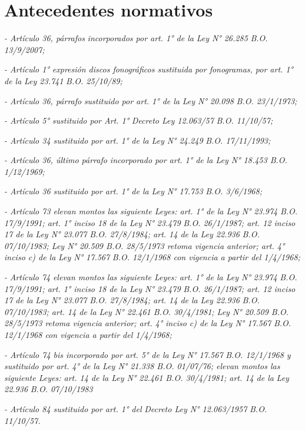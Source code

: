 \documentclass[10pt,a4paper]{article}
\newcommand{\nota}[1]{\par{\small\color{gris}#1\par}}
\begin{document}
\section{Antecedentes normativos}
\nota{\textit{- Artículo 36, párrafos }\textit{incorporados por art. 1° de la }\textit{Ley N° 26.285}\textit{ B.O. 13/9/2007;}}

\nota{\textit{- Artículo 1° expresión \textquotesingle{}discos fonográficos\textquotesingle{} sustituida por \textquotesingle{}fonogramas\textquotesingle{}, por art. 1° de la }\textit{Ley 23.741}\textit{ B.O. 25/10/89;}}

\nota{\textit{- Artículo 36, párrafo}\textit{ sustituido por art. 1° de la }\textit{Ley N° 20.098}\textit{ B.O. 23/1/1973;}}

\nota{\textit{- Artículo 5° sustituido por Art. 1° }\textit{Decreto Ley 12.063/57}\textit{ B.O. 11/10/57;}}

\nota{\textit{- Artículo 34 sustituido por art. 1° de la }\textit{Ley N° 24.249}\textit{ B.O. 17/11/1993;}}

\nota{\textit{- Artículo 36, último párrafo incorporado por art. 1° de la Ley N° 18.453 B.O. 1/12/1969;}}

\nota{\textit{- Artículo 36 sustituido por art. 1° de la }\textit{Ley N° 17.753}\textit{ B.O. 3/6/1968;}}

\nota{\textit{- Artículo 73 elevan montos las siguiente Leyes: art. 1° de la Ley N° }\textit{23.974}\textit{ B.O. 17/9/1991; art. 1° inciso 18 de la Ley N° }\textit{23.479}\textit{ B.O. 26/1/1987; art. 12 inciso 17 de la }\textit{Ley N° 23.077}\textit{ B.O. 27/8/1984; art. 14 de la }\textit{Ley 22.936}\textit{ B.O. 07/10/1983; Ley N° 20.509 B.O. 28/5/1973 retoma vigencia anterior; art. 4° inciso c) de la }\textit{Ley N° 17.567}\textit{ B.O. 12/1/1968 con vigencia a partir del 1/4/1968;}}

\nota{\textit{-} \textit{Artículo 74} \textit{elevan montos las siguiente Leyes: art. 1° de la Ley N° }\textit{23.974}\textit{ B.O. 17/9/1991; art. 1° inciso 18 de la Ley N° }\textit{23.479}\textit{ B.O. 26/1/1987; art. 12 inciso 17 de la }\textit{Ley N° 23.077}\textit{ B.O. 27/8/1984; art. 14 de la }\textit{Ley 22.936}\textit{ B.O. 07/10/1983; art. 14 de la Ley N° 22.461 B.O. 30/4/1981; Ley N° 20.509 B.O. 28/5/1973 retoma vigencia anterior; art. 4° inciso c) de la }\textit{Ley N° 17.567}\textit{ B.O. 12/1/1968 con vigencia a partir del 1/4/1968;}}

\nota{\textit{- Artículo 74 bis incorporado por art. 5° de la }\textit{Ley N° 17.567}\textit{ B.O. 12/1/1968 y sustituido por art. 4° de la Ley N° 21.338 B.O. 01/07/76; elevan montos las siguiente Leyes: art. 14 de la Ley N° 22.461 B.O. 30/4/1981; art. 14 de la }\textit{Ley 22.936}\textit{ B.O. 07/10/1983}}

\nota{\textit{- Artículo 84 sustituido por art. 1° del }\textit{Decreto Ley N° 12.063/1957}\textit{ B.O. 11/10/57.}}
\end{document}
